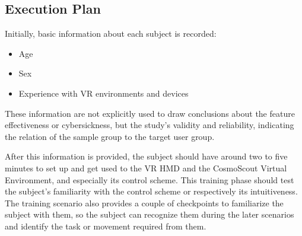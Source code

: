 \subsection{Execution Plan}\label{subsec:execution-plan}

Initially, basic information about each subject is recorded:
\begin{itemize}
    \item Age
    \item Sex
    \item Experience with VR environments and devices
\end{itemize}
These information are not explicitly used to draw conclusions about the feature effectiveness or cybersickness, but
the study's validity and reliability, indicating the relation of the sample group to the target user group.

After this information is provided, the subject should have around two to five minutes to set up and get used to the
VR HMD and the CosmoScout Virtual Environment, and especially its control scheme.
This training phase should test the subject's familiarity with the control scheme or respectively its intuitiveness.
The training scenario also provides a couple of checkpoints to familiarize the subject with them, so the subject
can recognize them during the later scenarios and identify the task or movement required from them.

